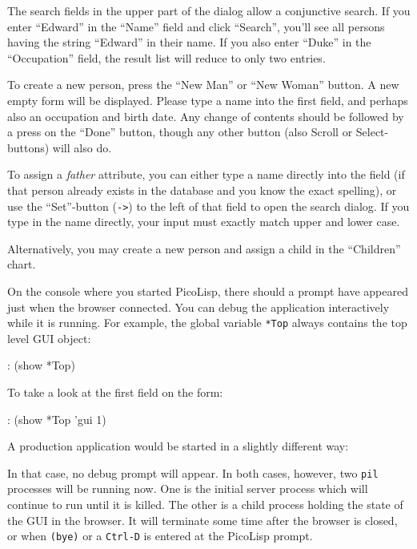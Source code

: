 The search fields in the upper part of the dialog allow a conjunctive
search. If you enter ``Edward'' in the ``Name'' field and click ``Search'',
you'll see all persons having the string ``Edward'' in their name. If you
also enter ``Duke'' in the ``Occupation'' field, the result list will reduce
to only two entries.

To create a new person, press the ``New Man'' or ``New Woman'' button. A new
empty form will be displayed. Please type a name into the first field,
and perhaps also an occupation and birth date. Any change of contents
should be followed by a press on the ``Done'' button, though any other
button (also Scroll or Select-buttons) will also do.

To assign a \emph{father} attribute, you can either type a name directly into
the field (if that person already exists in the database and you know
the exact spelling), or use the ``Set''-button (\texttt{->}) to the left of that
field to open the search dialog. If you type in the name directly, your
input must exactly match upper and lower case.

Alternatively, you may create a new person and assign a child in the
``Children'' chart.

On the console where you started PicoLisp, there should a prompt have
appeared just when the browser connected. You can debug the application
interactively while it is running. For example, the global variable
\texttt{*Top} always contains the top level GUI object:


\begin{wideverbatim}
: (show *Top)
\end{wideverbatim}

To take a look at the first field on the form:


\begin{wideverbatim}
: (show *Top 'gui 1)
\end{wideverbatim}

A production application would be started in a slightly different way:



In that case, no debug prompt will appear. In both cases, however, two
\texttt{pil} processes will be running now. One is the initial server process
which will continue to run until it is killed. The other is a child
process holding the state of the GUI in the browser. It will terminate
some time after the browser is closed, or when \texttt{(bye)} or a \texttt{Ctrl-D} is
entered at the PicoLisp prompt.

